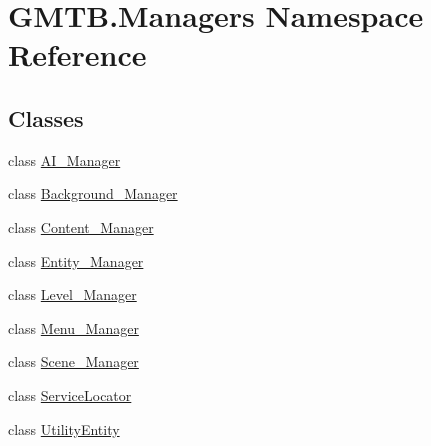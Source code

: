 \hypertarget{namespace_g_m_t_b_1_1_managers}{}\section{G\+M\+T\+B.\+Managers Namespace Reference}
\label{namespace_g_m_t_b_1_1_managers}
\subsection*{Classes}
\begin{DoxyCompactItemize}
\item 
class \mbox{\hyperlink{class_g_m_t_b_1_1_managers_1_1_a_i___manager}{A\+I\+\_\+\+Manager}}
\item 
class \mbox{\hyperlink{class_g_m_t_b_1_1_managers_1_1_background___manager}{Background\+\_\+\+Manager}}
\item 
class \mbox{\hyperlink{class_g_m_t_b_1_1_managers_1_1_content___manager}{Content\+\_\+\+Manager}}
\item 
class \mbox{\hyperlink{class_g_m_t_b_1_1_managers_1_1_entity___manager}{Entity\+\_\+\+Manager}}
\item 
class \mbox{\hyperlink{class_g_m_t_b_1_1_managers_1_1_level___manager}{Level\+\_\+\+Manager}}
\item 
class \mbox{\hyperlink{class_g_m_t_b_1_1_managers_1_1_menu___manager}{Menu\+\_\+\+Manager}}
\item 
class \mbox{\hyperlink{class_g_m_t_b_1_1_managers_1_1_scene___manager}{Scene\+\_\+\+Manager}}
\item 
class \mbox{\hyperlink{class_g_m_t_b_1_1_managers_1_1_service_locator}{Service\+Locator}}
\item 
class \mbox{\hyperlink{class_g_m_t_b_1_1_managers_1_1_utility_entity}{Utility\+Entity}}
\end{DoxyCompactItemize}
